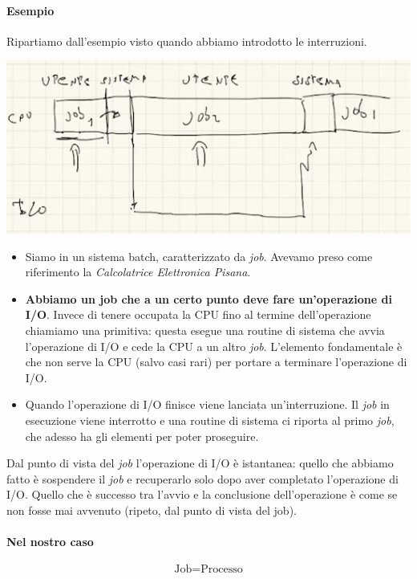 \documentclass[11pt]{report}
\theoremstyle{definition}
\begin{document}
\paragraph{Esempio} Ripartiamo dall'esempio visto quando abbiamo introdotto le interruzioni.
\begin{center}
	\includegraphics[scale=.8]{img/277.PNG}
\end{center}
\begin{itemize}
	\item Siamo in un sistema  batch, caratterizzato da \emph{job}. Avevamo preso come riferimento la \emph{Calcolatrice Elettronica Pisana}.
	\item \textbf{Abbiamo un job che a un certo punto deve fare un'operazione di I/O}. Invece di tenere occupata la CPU fino al termine dell'operazione chiamiamo una primitiva: questa esegue una routine di sistema che avvia l'operazione di I/O e cede la CPU a un altro \emph{job}. L'elemento fondamentale è che non serve la CPU (salvo casi rari) per portare a terminare l'operazione di I/O.
	\item Quando l'operazione di I/O finisce viene lanciata un'interruzione. Il \emph{job} in esecuzione viene interrotto e una routine di sistema ci riporta al primo \emph{job}, che adesso ha gli elementi per poter proseguire.
\end{itemize}
Dal punto di vista del \emph{job} l'operazione di I/O è istantanea: quello che abbiamo fatto è sospendere il \emph{job} e recuperarlo solo dopo aver completato l'operazione di I/O. Quello che è successo tra l'avvio e la conclusione dell'operazione è come se non fosse mai avvenuto (ripeto, dal punto di vista del job). 
\paragraph{Nel nostro caso} \[\boxed{\text{Job} = \text{Processo}}\]
\end{document}

